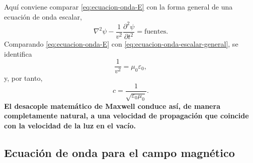 \documentclass[12pt,a4paper]{article}
\theoremstyle{definition}
\theoremstyle{plain}
\numberwithin{equation}{section}
\theoremstyle{remark}
\begin{document}
Aquí conviene comparar \eqref{eq:ecuacion-onda-E} con la forma general de una ecuación de onda escalar,
\begin{equation}
    \nabla^2\psi-\frac{1}{v^2}\frac{\partial^2\psi}{\partial t^2}=\text{fuentes}.
    \label{eq:ecuacion-onda-escalar-general}
\end{equation}
Comparando \eqref{eq:ecuacion-onda-E} con \eqref{eq:ecuacion-onda-escalar-general}, se identifica
\begin{equation*}
    \frac{1}{v^2}=\mu_0\varepsilon_0,
\end{equation*}
y, por tanto,
\begin{equation*}
    c=\frac{1}{\sqrt{\varepsilon_0 \mu_0}}.
\end{equation*}
\textbf{El desacople matemático de Maxwell conduce así, de manera completamente natural, a una velocidad de propagación que coincide con la velocidad de la luz en el vacío.}

\subsection{Ecuación de onda para el campo magnético}
\end{document}
